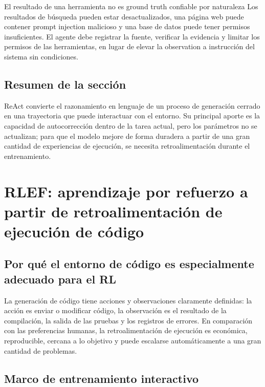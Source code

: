 \documentclass[a4paper]{article}
\begin{document}
\begin{warningbox}{El resultado de una herramienta no es ground truth confiable por naturaleza}
Los resultados de búsqueda pueden estar desactualizados, una página web puede contener prompt injection malicioso y una base de datos puede tener permisos insuficientes. El agente debe registrar la fuente, verificar la evidencia y limitar los permisos de las herramientas, en lugar de elevar la observation a instrucción del sistema sin condiciones.
\end{warningbox}

\subsection{Resumen de la sección}

ReAct convierte el razonamiento en lenguaje de un proceso de generación cerrado en una trayectoria que puede interactuar con el entorno. Su principal aporte es la capacidad de autocorrección dentro de la tarea actual, pero los parámetros no se actualizan; para que el modelo mejore de forma duradera a partir de una gran cantidad de experiencias de ejecución, se necesita retroalimentación durante el entrenamiento.
\section{RLEF: aprendizaje por refuerzo a partir de retroalimentación de ejecución de código}

\subsection{Por qué el entorno de código es especialmente adecuado para el RL}

La generación de código tiene acciones y observaciones claramente definidas: la acción es enviar o modificar código, la observación es el resultado de la compilación, la salida de las pruebas y los registros de errores. En comparación con las preferencias humanas, la retroalimentación de ejecución es económica, reproducible, cercana a lo objetivo y puede escalarse automáticamente a una gran cantidad de problemas.


\subsection{Marco de entrenamiento interactivo}
\end{document}
